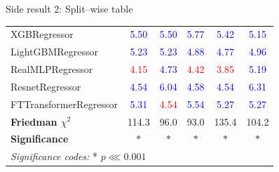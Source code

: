 \begin{frame}{Side result 2: Split–wise table}
\begin{longtable}{lccccc}
    XGBRegressor & \textcolor{blue}{5.50} & \textcolor{blue}{5.50} & \textcolor{blue}{5.77} & \textcolor{blue}{5.42} & \textcolor{blue}{5.15} \\

    LightGBMRegressor & \textcolor{blue}{5.23} & \textcolor{blue}{5.23} & \textcolor{blue}{4.88} & \textcolor{blue}{4.77} & \textcolor{blue}{4.96} \\

    RealMLPRegressor & \textcolor{red}{4.15} & \textcolor{blue}{4.73} & \textcolor{red}{4.42} & \textcolor{red}{3.85} & \textcolor{blue}{5.19} \\

    ResnetRegressor & \textcolor{blue}{4.54} & \textcolor{blue}{6.04} & \textcolor{blue}{4.58} & \textcolor{blue}{4.54} & \textcolor{blue}{6.31} \\

    FTTransformerRegressor & \textcolor{blue}{5.31} & \textcolor{red}{4.54} & \textcolor{blue}{5.54} & \textcolor{blue}{5.27} & \textcolor{blue}{5.27} \\

    \addlinespace
    \midrule
    \textbf{Friedman $\chi^2$} &
    114.3 & 96.0 & 93.0 & 135.4 & 104.2 \\

    \textbf{Significance} &
    $\ast$ & $\ast$ & $\ast$ & $\ast$ & $\ast$ \\

    \multicolumn{5}{l}{\footnotesize
    \tiny \textit{Significance codes:} * $p \lll  0.001$}
    \\

    \end{longtable}
\end{frame}